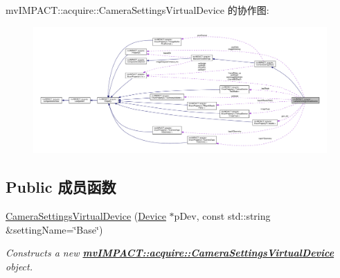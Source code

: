 mv\+I\+M\+P\+A\+C\+T\+:\+:acquire\+:\+:Camera\+Settings\+Virtual\+Device 的协作图\+:
\nopagebreak
\begin{figure}[H]
\begin{center}
\leavevmode
\includegraphics[width=350pt]{classmv_i_m_p_a_c_t_1_1acquire_1_1_camera_settings_virtual_device__coll__graph}
\end{center}
\end{figure}
\subsection*{Public 成员函数}
\begin{DoxyCompactItemize}
\item 
\hyperlink{classmv_i_m_p_a_c_t_1_1acquire_1_1_camera_settings_virtual_device_ab3c227879b2b35d67a4598af1dd9f25c}{Camera\+Settings\+Virtual\+Device} (\hyperlink{classmv_i_m_p_a_c_t_1_1acquire_1_1_device}{Device} $\ast$p\+Dev, const std\+::string \&setting\+Name=\char`\"{}Base\char`\"{})
\begin{DoxyCompactList}\small\item\em Constructs a new {\bfseries \hyperlink{classmv_i_m_p_a_c_t_1_1acquire_1_1_camera_settings_virtual_device}{mv\+I\+M\+P\+A\+C\+T\+::acquire\+::\+Camera\+Settings\+Virtual\+Device}} object. \end{DoxyCompactList}\end{DoxyCompactItemize}
